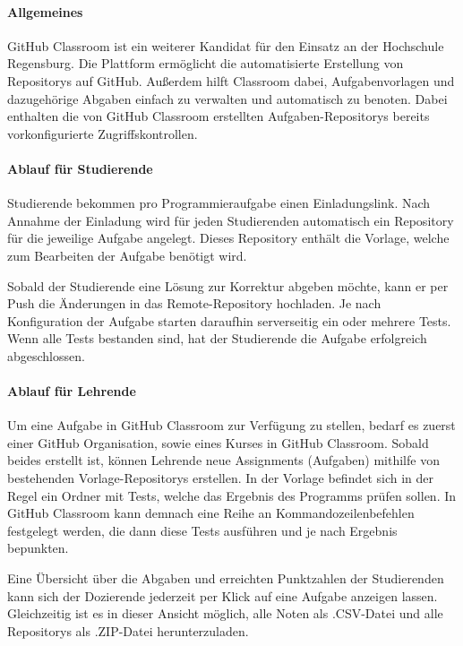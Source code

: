 \paragraph{Allgemeines}
GitHub Classroom ist ein weiterer Kandidat für den Einsatz an der
Hochschule Regensburg. Die Plattform ermöglicht die automatisierte
Erstellung von Repositorys auf GitHub. Außerdem hilft Classroom dabei,
Aufgabenvorlagen und dazugehörige Abgaben einfach zu verwalten und automatisch
zu benoten. Dabei enthalten die von GitHub Classroom erstellten
Aufgaben-Repositorys bereits vorkonfigurierte Zugriffskontrollen.
\parencite{github-classroom-startseite}

\paragraph{Ablauf für Studierende}
Studierende bekommen pro Programmieraufgabe einen Einladungslink. Nach Annahme
der Einladung wird für jeden Studierenden automatisch ein Repository für die
jeweilige Aufgabe angelegt. Dieses Repository enthält die Vorlage, welche zum
Bearbeiten der Aufgabe benötigt wird.

Sobald der Studierende eine Lösung zur Korrektur abgeben möchte, kann er per
Push die Änderungen in das Remote-Repository hochladen. Je nach Konfiguration
der Aufgabe starten daraufhin serverseitig ein oder mehrere Tests. Wenn alle
Tests bestanden sind, hat der Studierende die Aufgabe erfolgreich abgeschlossen.

\paragraph{Ablauf für Lehrende}
Um eine Aufgabe in GitHub Classroom zur Verfügung zu stellen, bedarf es zuerst
einer GitHub Organisation, sowie eines Kurses in GitHub Classroom. Sobald beides
erstellt ist, können Lehrende neue Assignments (Aufgaben) mithilfe von
bestehenden Vorlage-Repositorys erstellen. In der Vorlage befindet sich in der
Regel ein Ordner mit Tests, welche das Ergebnis des Programms prüfen sollen.
In GitHub Classroom kann demnach eine Reihe an Kommandozeilenbefehlen festgelegt
werden, die dann diese Tests ausführen und je nach Ergebnis bepunkten.

Eine Übersicht über die Abgaben und erreichten Punktzahlen der Studierenden kann
sich der Dozierende jederzeit per Klick auf eine Aufgabe anzeigen lassen.
Gleichzeitig ist es in dieser Ansicht möglich, alle Noten als .CSV-Datei und
alle Repositorys als .ZIP-Datei herunterzuladen.

